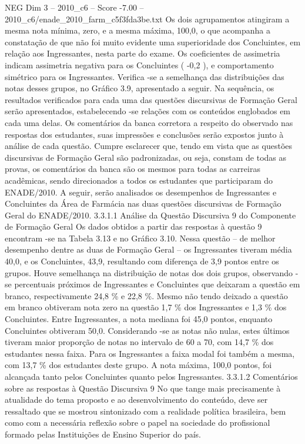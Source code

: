 \begin{textsample}{NEG Dim 3 – 2010\_c6 – Score -7.00 – 2010\_c6/enade\_2010\_farm\_c5f3fda3be.txt}
Os dois agrupamentos atingiram a mesma nota mínima, zero, e a mesma máxima, 100,0, o que acompanha a constatação de que não foi muito evidente uma superioridade dos Concluintes, em relação aos Ingressantes, nesta parte do exame.
Os coeficientes de assimetria indicam assimetria negativa para os Concluintes ( -0,2 ), e comportamento simétrico para os Ingressantes.
Verifica -se a semelhança das distribuições das notas desses grupos, no Gráfico 3.9, apresentado a seguir.
Na sequência, os resultados verificados para cada uma das questões discursivas de Formação Geral serão apresentados, estabelecendo -se relações com os conteúdos englobados em cada uma delas.
Os comentários da banca corretora a respeito do observado nas respostas dos estudantes, suas impressões e conclusões serão expostos junto à análise de cada questão.
Cumpre esclarecer que, tendo em vista que as questões discursivas de Formação Geral são padronizadas, ou seja, constam de todas as provas, os comentários da banca são os mesmos para todas as carreiras acadêmicas, sendo direcionados a todos os estudantes que participaram do ENADE/2010.
A seguir, serão analisados os desempenhos de Ingressantes e Concluintes da Área de Farmácia nas duas questões discursivas de Formação Geral do ENADE/2010. 3.3.1.1 Análise da Questão Discursiva 9 do Componente de Formação Geral Os dados obtidos a partir das respostas à questão 9 encontram -se na Tabela 3.13 e no Gráfico 3.10.
Nessa questão – de melhor desempenho dentre as duas de Formação Geral – os Ingressantes tiveram média 40,0, e os Concluintes, 43,9, resultando com diferença de 3,9 pontos entre os grupos.
Houve semelhança na distribuição de notas dos dois grupos, observando -se percentuais próximos de Ingressantes e Concluintes que deixaram a questão em branco, respectivamente 24,8 \% e 22,8 \%.
Mesmo não tendo deixado a questão em branco obtiveram nota zero na questão 1,7 \% dos Ingressantes e 1,3 \% dos Concluintes.
Entre Ingressantes, a nota mediana foi 45,0 pontos, enquanto Concluintes obtiveram 50,0.
Considerando -se as notas não nulas, estes últimos tiveram maior proporção de notas no intervalo de 60 a 70, com 14,7 \% dos estudantes nessa faixa.
Para os Ingressantes a faixa modal foi também a mesma, com 13,7 \% dos estudantes deste grupo.
A nota máxima, 100,0 pontos, foi alcançada tanto pelos Concluintes quanto pelos Ingressantes. 3.3.1.2 Comentários sobre as respostas à Questão Discursiva 9 No que tange mais precisamente à atualidade do tema proposto e ao desenvolvimento do conteúdo, deve ser ressaltado que se mostrou sintonizado com a realidade política brasileira, bem como com a necessária reflexão sobre o papel na sociedade do profissional formado pelas Instituições de Ensino Superior do país.

\end{textsample}

